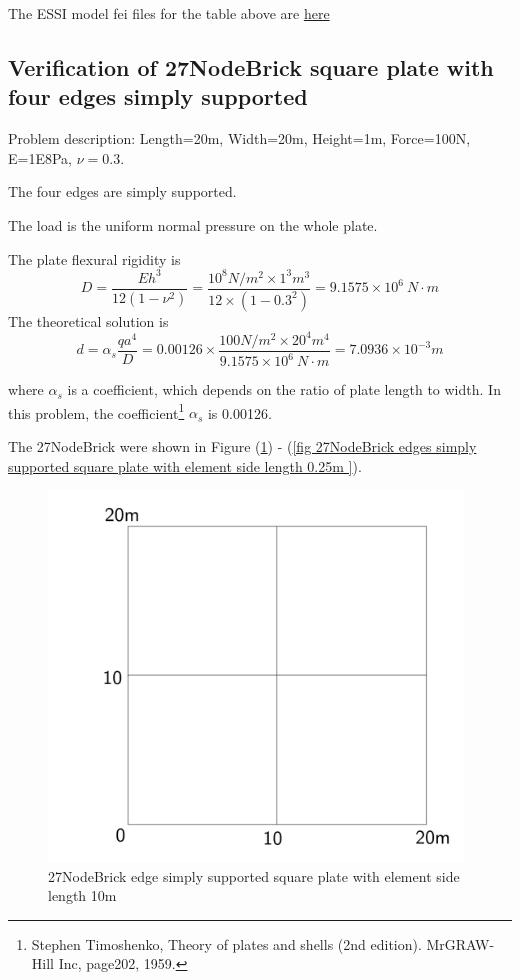 \documentclass[fleqn,11pt]{article}
\begin{document}
The ESSI model fei files for the table above are \href{https://github.com/yuan-energy/ESSI_Verification/blob/master/27NodeBrick/square_plate_clamped/square_plate_clamped.tar.gz?raw=true}{here}



\newpage
\subsection{Verification of 27NodeBrick square plate with four edges simply supported}

Problem description: Length=20m, Width=20m, Height=1m, Force=100N, E=1E8Pa, $\nu=0.3$. 

The four edges are simply supported. 

The load is the uniform normal pressure on the whole plate. 

The plate flexural rigidity is 
\begin{equation}
  D=\frac{Eh^3}{12(1-\nu^2)}=\frac{10^8 N/m^2 \times 1^3 m^3 }{12 \times (1-0.3^2) }= 9.1575 \times 10^6 \ N\cdot m
\end{equation}
The theoretical solution is 
\begin{equation}
  d=\alpha_s \frac{q a^4}{D}=0.00126\times \frac{100 N/m^2 \times 20^4 m^4}{9.1575 \times 10^6 \ N\cdot m}=7.0936\times 10^{-3} m
\end{equation}

where $\alpha_s$ is a coefficient, which depends on the ratio of plate length to width. In this problem, the coefficient\footnote{Stephen Timoshenko, Theory of plates and shells (2nd edition). MrGRAW-Hill Inc, page202, 1959.} $\alpha_s$ is 0.00126.

The 27NodeBrick were shown in Figure (\ref{fig 27NodeBrick edges simply supported square plate with element side length 10m }) - (\ref{fig 27NodeBrick edges simply supported square plate with element side length 0.25m }). 



\begin{figure}[H]
  \centering
  \includegraphics[width=11cm]{../Figure-files/square_plate1.pdf}
  \caption{27NodeBrick edge simply supported square plate with element side length 10m }
  \label{fig 27NodeBrick edges simply supported square plate with element side length 10m }
\end{figure}
\end{document}

